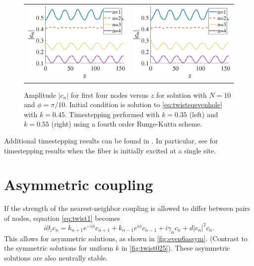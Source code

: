 \documentclass[12pt,reqno]{amsart}
\begin{document}
\begin{figure}[H]
\begin{center}
\begin{tabular}{cc}
\includegraphics[width=7.5cm]{images/even10pertk45to35} & 
\includegraphics[width=7.5cm]{images/even10pertk45to35}
\end{tabular}
\end{center}
\caption{Amplitude $|c_n|$ for first four nodes versus $z$ for solution with $N=10$ and $\phi = \pi/10$. Initial condition is solution to \cref{eq:twisteqevenhole} with $k = 0.45$. Timestepping performed with $k = 0.35$ (left) and $k = 0.55$ (right) using a fourth order Runge-Kutta scheme.}
\label{fig:evenholekperturbed}
\end{figure}
Additional timestepping results can be found in \cite{castro2016}. In particular, see \cite[Figure 4]{castro2016} for timestepping results when the fiber is initially excited at a single site. 

\section{Asymmetric coupling}\label{sec:variants}

If the strength of the nearest-neighbor coupling is allowed to differ between pairs of nodes, equation \cref{eq:twist1} becomes
\begin{equation}\label{eq:twistk}
i \partial_z c_n = k_{n+1} e^{-i\phi}c_{n+1} + k_{n-1} e^{i\phi}c_{n-1} + i \gamma_n c_n + d |c_n|^2 c_n.
\end{equation}
This allows for asymmetric solutions, as shown in \cref{fig:even6assym}. (Contrast to the symmetric solutions for uniform $k$ in \cref{fig:twist025}). These asymmetric solutions are also neutrally stable. 
\end{document}
